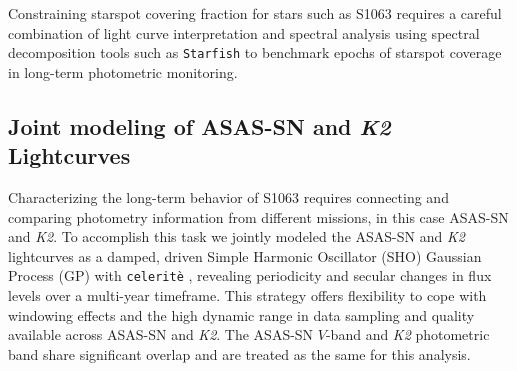 \documentclass[trackchanges]{aastex631}
\begin{document}

Constraining starspot covering fraction for stars such as S1063 requires a careful combination of light curve interpretation and spectral analysis using spectral decomposition tools such as \texttt{Starfish} \citep{czekala15} to benchmark epochs of starspot coverage in long-term photometric monitoring.

\subsection{Joint modeling of ASAS-SN and \emph{K2} Lightcurves}
Characterizing the long-term behavior of S1063 requires connecting and comparing photometry information from different missions, in this case ASAS-SN and \emph{K2}. To accomplish this task we jointly modeled the ASAS-SN and \emph{K2} lightcurves as a damped, driven Simple Harmonic Oscillator (SHO) Gaussian Process (GP) with \texttt{celerit\`e} \citep{2017AJ....154..220F}, revealing periodicity and secular changes in flux levels over a multi-year timeframe.  This strategy offers flexibility to cope with windowing effects and the high dynamic range in data sampling and quality available across ASAS-SN and \emph{K2}.  The ASAS-SN $V$-band and \emph{K2} photometric band share significant overlap and are treated as the same for this analysis.
\end{document}
